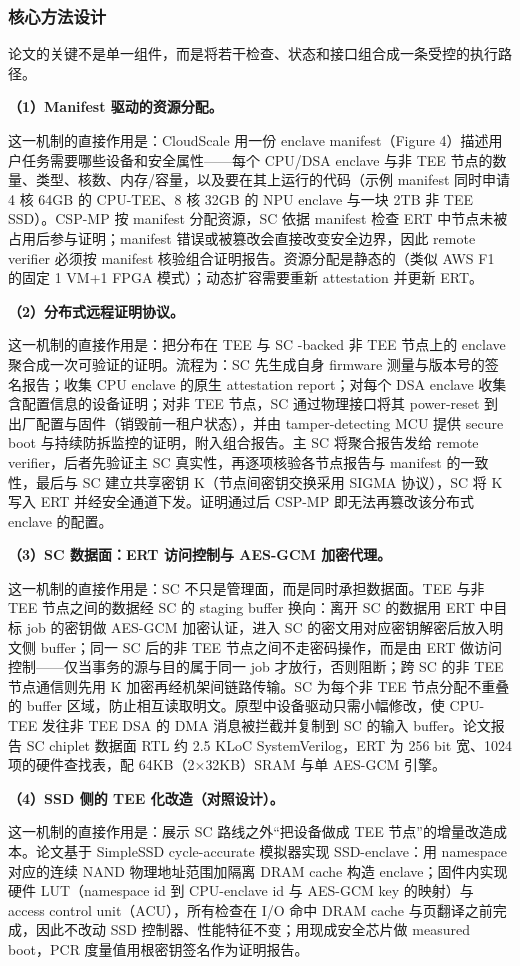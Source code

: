 \documentclass[11pt]{ctexart}
\begin{document}
\subsubsection{核心方法设计}
论文的关键不是单一组件，而是将若干检查、状态和接口组合成一条受控的执行路径。\par
\noindent\textbf{（1）Manifest 驱动的资源分配。}\par
这一机制的直接作用是：CloudScale 用一份 enclave manifest（Figure 4）描述用户任务需要哪些设备和安全属性——每个 CPU/DSA enclave 与非 TEE 节点的数量、类型、核数、内存/容量，以及要在其上运行的代码（示例 manifest 同时申请 4 核 64GB 的 CPU-TEE、8 核 32GB 的 NPU enclave 与一块 2TB 非 TEE SSD）。CSP-MP 按 manifest 分配资源，SC 依据 manifest 检查 ERT 中节点未被占用后参与证明；manifest 错误或被篡改会直接改变安全边界，因此 remote verifier 必须按 manifest 核验组合证明报告。资源分配是静态的（类似 AWS F1 的固定 1 VM+1 FPGA 模式）；动态扩容需要重新 attestation 并更新 ERT。\par
\noindent\textbf{（2）分布式远程证明协议。}\par
这一机制的直接作用是：把分布在 TEE 与 SC -backed 非 TEE 节点上的 enclave 聚合成一次可验证的证明。流程为：SC 先生成自身 firmware 测量与版本号的签名报告；收集 CPU enclave 的原生 attestation report；对每个 DSA enclave 收集含配置信息的设备证明；对非 TEE 节点，SC 通过物理接口将其 power-reset 到出厂配置与固件（销毁前一租户状态），并由 tamper-detecting MCU 提供 secure boot 与持续防拆监控的证明，附入组合报告。主 SC 将聚合报告发给 remote verifier，后者先验证主 SC 真实性，再逐项核验各节点报告与 manifest 的一致性，最后与 SC 建立共享密钥 K（节点间密钥交换采用 SIGMA 协议），SC 将 K 写入 ERT 并经安全通道下发。证明通过后 CSP-MP 即无法再篡改该分布式 enclave 的配置。\par
\noindent\textbf{（3）SC 数据面：ERT 访问控制与 AES-GCM 加密代理。}\par
这一机制的直接作用是：SC 不只是管理面，而是同时承担数据面。TEE 与非 TEE 节点之间的数据经 SC 的 staging buffer 换向：离开 SC 的数据用 ERT 中目标 job 的密钥做 AES-GCM 加密认证，进入 SC 的密文用对应密钥解密后放入明文侧 buffer；同一 SC 后的非 TEE 节点之间不走密码操作，而是由 ERT 做访问控制——仅当事务的源与目的属于同一 job 才放行，否则阻断；跨 SC 的非 TEE 节点通信则先用 K 加密再经机架间链路传输。SC 为每个非 TEE 节点分配不重叠的 buffer 区域，防止相互读取明文。原型中设备驱动只需小幅修改，使 CPU-TEE 发往非 TEE DSA 的 DMA 消息被拦截并复制到 SC 的输入 buffer。论文报告 SC chiplet 数据面 RTL 约 2.5 KLoC SystemVerilog，ERT 为 256 bit 宽、1024 项的硬件查找表，配 64KB（2$\times$32KB）SRAM 与单 AES-GCM 引擎。\par
\noindent\textbf{（4）SSD 侧的 TEE 化改造（对照设计）。}\par
这一机制的直接作用是：展示 SC 路线之外``把设备做成 TEE 节点''的增量改造成本。论文基于 SimpleSSD cycle-accurate 模拟器实现 SSD-enclave：用 namespace 对应的连续 NAND 物理地址范围加隔离 DRAM cache 构造 enclave；固件内实现硬件 LUT（namespace id 到 CPU-enclave id 与 AES-GCM key 的映射）与 access control unit（ACU），所有检查在 I/O 命中 DRAM cache 与页翻译之前完成，因此不改动 SSD 控制器、性能特征不变；用现成安全芯片做 measured boot，PCR 度量值用根密钥签名作为证明报告。\par
\end{document}
